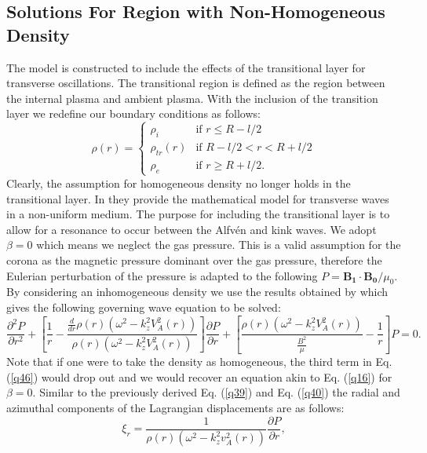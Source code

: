 \documentclass[12pt,a4paper,twoside]{article}
\newcommand{\Alfven}{Alfv\'{e}n }
\begin{document}
\subsection{Solutions For Region with Non-Homogeneous Density}
The model is constructed to include the effects of the transitional layer for transverse oscillations. The transitional region is defined as the region between the internal plasma and ambient plasma. With the inclusion of the transition layer we redefine our boundary conditions as follows: 
\begin{equation}
\rho (r) = \left\{ \begin{array}{lll}
         \rho_i & \mbox{if $r \leq R -l/2$} \\
         \rho_{tr}(r) & \mbox{if $R -l/2 < r < R+l/2$}\\
        \rho_e & \mbox{if $r \geq R +l/2$}.\end{array} \right.
\end{equation}
Clearly, the assumption for homogeneous density no longer holds in the transitional layer. In \cite{Soler_2013} they provide the mathematical model for transverse waves in a non-uniform medium. The purpose for including the transitional layer is to allow for a resonance to occur between the \Alfven and kink waves. We adopt $\beta = 0$ which means we neglect the gas pressure. This is a valid assumption for the corona as the magnetic pressure dominant over the gas pressure, therefore the Eulerian perturbation of the pressure is adapted to the following $P = \mathbf{B_1} \cdot \mathbf{B_0} / \mu_0$. By considering an inhomogeneous density we use the results obtained by \cite{Soler_2013} which gives the following governing wave equation to be solved:    
\begin{equation}\label{q46}
\frac{\partial^2 P}{\partial r^2} + \left[ \frac{1}{r} - \frac{\frac{d}{dr}\rho(r)(\omega^2-k^2_z V^2_A(r))}{\rho(r)(\omega^2-k_z^2V^2_A(r))} \right]\frac{\partial P}{\partial r} + \left[ \frac{\rho(r) (\omega^2-k_z^2 V^2_A(r))}{\frac{B^2}{\mu}} - \frac{1}{r} \right]P = 0 .
\end{equation}
Note that if one were to take the density as homogeneous, the third term in Eq. (\ref{q46}) would drop out and we would recover an equation akin to Eq. (\ref{q16}) for $\beta = 0$. Similar to the previously derived Eq. (\ref{q39}) and Eq. (\ref{q40}) the radial and azimuthal components of the Lagrangian displacements are as follows:
\begin{equation}\label{q51}
\xi_r = \frac{1}{\rho(r)(\omega^2-k^2_z v^2_A(r))} \frac{\partial P}{\partial r} ,
\end{equation} 
\end{document}
